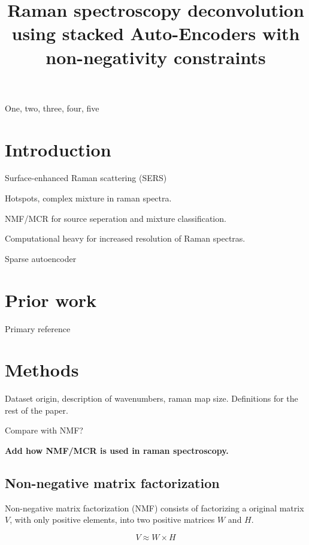 \documentclass{article}
\title{Raman spectroscopy deconvolution using stacked Auto-Encoders with non-negativity constraints}
\begin{document}
%

\maketitle
%
\begin{abstract}

\end{abstract}
%
\begin{keywords}
One, two, three, four, five
\end{keywords}
%
\section{Introduction}
\label{sec:intro}

Surface-enhanced Raman scattering (SERS)

Hotspots, complex mixture in raman spectra. 

NMF/MCR for source seperation and mixture classification.

Computational heavy for increased resolution of Raman spectras.

Sparse autoencoder

\section{Prior work}
\label{sec:prior}



Primary reference \cite{Hosseini-Asl2016}

\section{Methods}
\label{sec:methods}

Dataset origin, description of wavenumbers, raman map size. Definitions for the rest of the paper.

Compare with NMF?

\textbf{Add how NMF/MCR is used in raman spectroscopy.}

\subsection{Non-negative matrix factorization}

Non-negative matrix factorization (NMF) consists of factorizing a original matrix $V$, with only positive elements, into two positive matrices $W$ and $H$. \cite{Seung1999}


\begin{equation}
V \approx W \times H
\end{equation}
\end{document}
